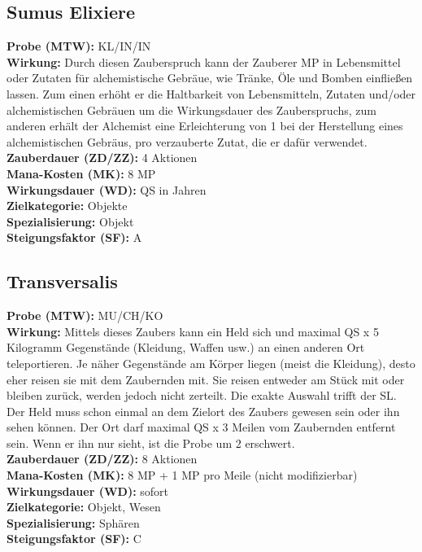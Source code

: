 \subsection{Sumus Elixiere}
\label{chap:sumus_elixiere}
\textbf{Probe (MTW):} KL/IN/IN \\
\textbf{Wirkung:} Durch diesen Zauberspruch kann der Zauberer MP in Lebensmittel oder Zutaten für alchemistische Gebräue, wie Tränke, Öle und Bomben einfließen lassen. Zum einen erhöht er die Haltbarkeit von Lebensmitteln, Zutaten und/oder alchemistischen Gebräuen um die Wirkungsdauer des Zauberspruchs, zum anderen erhält der Alchemist eine Erleichterung von 1 bei der Herstellung eines alchemistischen Gebräus, pro verzauberte Zutat, die er dafür verwendet. \\
\textbf{Zauberdauer (ZD/ZZ):} 4 Aktionen \\
\textbf{Mana-Kosten (MK):} 8 MP \\
\textbf{Wirkungsdauer (WD):} QS in Jahren \\
\textbf{Zielkategorie:} Objekte \\
\textbf{Spezialisierung:} Objekt \\
\textbf{Steigungsfaktor (SF):} A


\subsection{Transversalis}
\label{chap:transversalis}
\textbf{Probe (MTW):} MU/CH/KO \\
\textbf{Wirkung:} Mittels dieses Zaubers kann ein Held sich und maximal QS x 5 Kilogramm Gegenstände (Kleidung, Waffen usw.) an einen anderen Ort teleportieren. Je näher Gegenstände am Körper liegen (meist die Kleidung), desto eher reisen sie mit dem Zaubernden mit. Sie reisen entweder am Stück mit oder bleiben zurück, werden jedoch nicht zerteilt. Die exakte Auswahl trifft der SL. Der Held muss schon einmal an dem Zielort des Zaubers gewesen sein oder ihn sehen können. Der Ort darf maximal QS x 3 Meilen vom Zaubernden entfernt sein. Wenn er ihn nur sieht, ist die Probe um 2 erschwert. \\
\textbf{Zauberdauer (ZD/ZZ):} 8 Aktionen \\
\textbf{Mana-Kosten (MK):} 8 MP + 1 MP pro Meile (nicht modifizierbar) \\
\textbf{Wirkungsdauer (WD):} sofort \\
\textbf{Zielkategorie:} Objekt, Wesen \\
\textbf{Spezialisierung:} Sphären \\
\textbf{Steigungsfaktor (SF):} C


